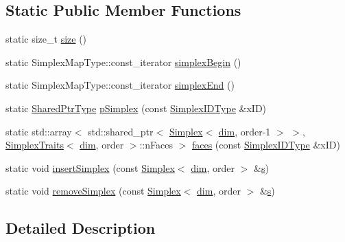 \subsection*{Static Public Member Functions}
\begin{DoxyCompactItemize}
\item 
static size\+\_\+t \hyperlink{structmodel_1_1_simplex_observer_a11e24ec9ed0d891bf0e95f4bd74927c7}{size} ()
\item 
static Simplex\+Map\+Type\+::const\+\_\+iterator \hyperlink{structmodel_1_1_simplex_observer_a8238aadd21964e2ea7972a6f294ed8d5}{simplex\+Begin} ()
\item 
static Simplex\+Map\+Type\+::const\+\_\+iterator \hyperlink{structmodel_1_1_simplex_observer_a70e2f925e9d10d0dfdb8f1ecbbff554d}{simplex\+End} ()
\item 
static \hyperlink{structmodel_1_1_simplex_observer_a8e2b7dce7a23bc6c4cdf87b7d606ca2b}{Shared\+Ptr\+Type} \hyperlink{structmodel_1_1_simplex_observer_a791a8f4507d2fb9cf9e2904fb55f258b}{p\+Simplex} (const \hyperlink{structmodel_1_1_simplex_observer_a270d41a2f2b7393f03651f9900b62c0b}{Simplex\+I\+D\+Type} \&x\+I\+D)
\item 
static std\+::array$<$ std\+::shared\+\_\+ptr$<$ \hyperlink{classmodel_1_1_simplex}{Simplex}$<$ \hyperlink{plot_nd_a_8m_a382f3ca768b275b8d563604f7fc7df73}{dim}, order-\/1 $>$ $>$, \hyperlink{structmodel_1_1_simplex_traits}{Simplex\+Traits}$<$ \hyperlink{plot_nd_a_8m_a382f3ca768b275b8d563604f7fc7df73}{dim}, order $>$\+::n\+Faces $>$ \hyperlink{structmodel_1_1_simplex_observer_a4eaec5365e40cb1f1d98846bb5a42a9e}{faces} (const \hyperlink{structmodel_1_1_simplex_observer_a270d41a2f2b7393f03651f9900b62c0b}{Simplex\+I\+D\+Type} \&x\+I\+D)
\item 
static void \hyperlink{structmodel_1_1_simplex_observer_a85591ec7a8c08f8a303dc03f6405990a}{insert\+Simplex} (const \hyperlink{classmodel_1_1_simplex}{Simplex}$<$ \hyperlink{plot_nd_a_8m_a382f3ca768b275b8d563604f7fc7df73}{dim}, order $>$ \&\hyperlink{_cubic_spline_intersection_8m_aec5b2c7fb98ca9f11d2c624f6d8ae9d9}{s})
\item 
static void \hyperlink{structmodel_1_1_simplex_observer_acd3b33890ad0aa0cee424cb8cc6d56fe}{remove\+Simplex} (const \hyperlink{classmodel_1_1_simplex}{Simplex}$<$ \hyperlink{plot_nd_a_8m_a382f3ca768b275b8d563604f7fc7df73}{dim}, order $>$ \&\hyperlink{_cubic_spline_intersection_8m_aec5b2c7fb98ca9f11d2c624f6d8ae9d9}{s})
\end{DoxyCompactItemize}


\subsection{Detailed Description}
